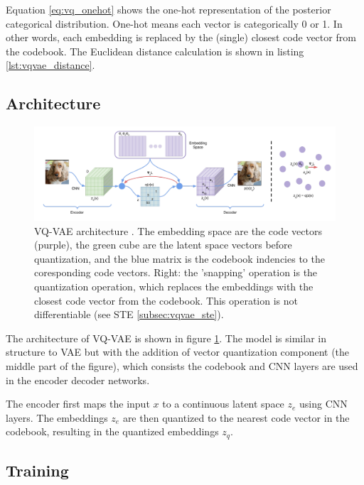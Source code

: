 Equation \ref{eq:vq_onehot} shows the one-hot representation of the posterior categorical distribution. One-hot means each vector is categorically 0 or 1. In other words, each embedding is replaced by the (single) closest code vector from the codebook. The Euclidean distance calculation is shown in listing \ref{lst:vqvae_distance}.


\subsection{Architecture}

\begin{figure}[h]
    \centering
    \includegraphics[width=\textwidth]{images/vqvae_architecture.png}
    \caption{VQ-VAE architecture \cite{vqvae}. The embedding space are the code vectors (purple), the green cube are the latent space vectors before quantization, and the blue matrix is the codebook indencies to the coresponding code vectors. Right: the 'snapping' operation is the quantization operation, which replaces the embeddings with the closest code vector from the codebook. This operation is not differentiable (see STE \ref{subsec:vqvae_ste}).}
    \label{fig:vqvae_architecture}
\end{figure}

The architecture of VQ-VAE is shown in figure \ref{fig:vqvae_architecture}. The model is similar in structure to VAE but with the addition of vector quantization component (the middle part of the figure), which consists the codebook and CNN layers are used in the encoder decoder networks.

The encoder first maps the input $x$ to a continuous latent space $z_e$ using CNN layers. The embeddings $z_e$ are then quantized to the nearest code vector in the codebook, resulting in the quantized embeddings $z_q$. 

\subsection{Training}



